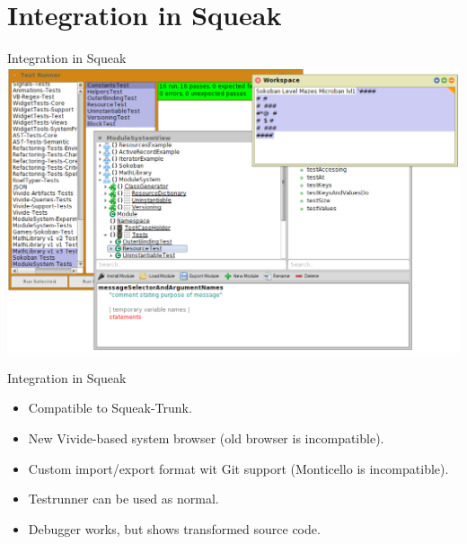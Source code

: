 \documentclass[xcolor=dvipsname, handout]{beamer} %
\newenvironment{explainframe}[1]{
\setboolean{isexplainframe}{true}
\addtocounter{framenumber}{-1}
\setbeamertemplate{background}[grid][step=5mm,color=LightGray]
\begin{frame}[fragile,environment=explainframe]{Handout only: #1}%
}{%
\end{frame}%
\setboolean{isexplainframe}{false}
}
\newenvironment{clearexplainframe}[0]{
\setboolean{isexplainframe}{true}
\addtocounter{framenumber}{-1}
\setbeamertemplate{background}[grid][step=5mm,color=LightGray]
\begin{frame}[fragile,environment=clearexplainframe]%
}{%
\end{frame}%
\setboolean{isexplainframe}{false}
}
\begin{document}



\section{Integration in Squeak}
\begin{frame}{Integration in Squeak}
  \centering
  \includegraphics[width=\textwidth]{screenshot_integration.png}
\end{frame}

\begin{frame}{Integration in Squeak}
\begin{itemize}
  \item Compatible to Squeak-Trunk.
  \item New Vivide-based system browser (old browser is incompatible).
  \item Custom import/export format wit Git support (Monticello is incompatible).
  \item Testrunner can be used as normal.
  \item Debugger works, but shows transformed source code.
\end{itemize}
\end{frame}
\end{document}
